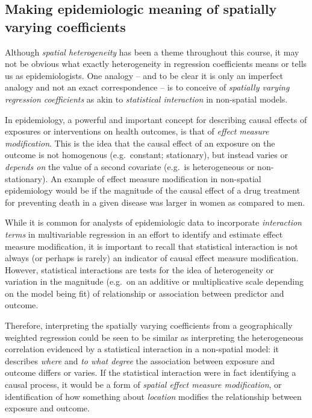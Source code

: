 \documentclass[
]{book}
\begin{document}
\hypertarget{making-epidemiologic-meaning-of-spatially-varying-coefficients}{%
\subsection{Making epidemiologic meaning of spatially varying coefficients}\label{making-epidemiologic-meaning-of-spatially-varying-coefficients}}

Although \emph{spatial heterogeneity} has been a theme throughout this course, it may not be obvious what exactly heterogeneity in regression coefficients means or tells us as epidemiologists. One analogy -- and to be clear it is only an imperfect analogy and not an exact correspondence -- is to conceive of \emph{spatially varying regression coefficients} as akin to \emph{statistical interaction} in non-spatial models.

In epidemiology, a powerful and important concept for describing causal effects of exposures or interventions on health outcomes, is that of \emph{effect measure modification}. This is the idea that the causal effect of an exposure on the outcome is not homogenous (e.g.~constant; stationary), but instead varies or \emph{depends on} the value of a second covariate (e.g.~is heterogeneous or non-stationary). An example of effect measure modification in non-spatial epidemiology would be if the magnitude of the causal effect of a drug treatment for preventing death in a given disease was larger in women as compared to men.

While it is common for analysts of epidemiologic data to incorporate \emph{interaction terms} in multivariable regression in an effort to identify and estimate effect measure modification, it is important to recall that statistical interaction is not always (or perhaps is rarely) an indicator of causal effect measure modification. However, statistical interactions are tests for the idea of heterogeneity or variation in the magnitude (e.g.~on an additive or multiplicative scale depending on the model being fit) of relationship or association between predictor and outcome.

Therefore, interpreting the spatially varying coefficients from a geographically weighted regression could be seen to be similar as interpreting the heterogeneous correlation evidenced by a statistical interaction in a non-spatial model: it describes \emph{where} and \emph{to what degree} the association between exposure and outcome differs or varies. If the statistical interaction were in fact identifying a causal process, it would be a form of \emph{spatial effect measure modification}, or identification of how something about \emph{location} modifies the relationship between exposure and outcome.
\end{document}
